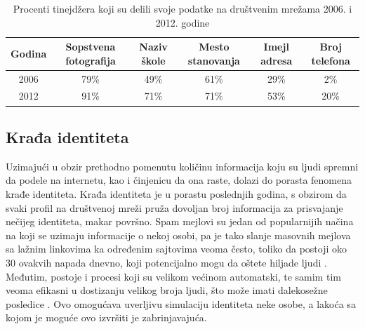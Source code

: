 \documentclass[a4paper]{article}
\begin{document}
\begin{table}[h!]
	\begin{center}
		\caption{Procenti tinejdžera koji su delili svoje podatke na društvenim mrežama 2006. i 2012. godine}
		\begin{tabular}{|c | c c c c c|} \hline
			Godina & Sopstvena fotografija & Naziv škole & Mesto stanovanja & Imejl adresa & Broj telefona \\
			\hline
			2006 & 79\% & 49\% & 61\% & 29\% & 2\% \\
			2012 & 91\% & 71\% & 71\% & 53\% & 20\%\\
			\hline
		\end{tabular}
		\label{tab:tabela1}
	\end{center}
\end{table}

\subsection{Krađa identiteta}
Uzimajući u obzir prethodno pomenutu količinu informacija koju su ljudi spremni da podele na internetu, kao i činjenicu da ona raste, dolazi do porasta fenomena krađe identiteta. Krađa identiteta je u porastu poslednjih godina, s obzirom da svaki profil na društvenoj mreži pruža dovoljan broj informacija za prisvajanje nečijeg identiteta, makar površno. Spam mejlovi su jedan od popularnijih načina na koji se uzimaju informacije o nekoj osobi, pa je tako slanje masovnih mejlova sa lažnim linkovima ka određenim sajtovima veoma često, toliko da postoji oko 30 ovakvih napada dnevno, koji potencijalno mogu da oštete hiljade ljudi \cite{it1}. Međutim, postoje i procesi koji su velikom većinom automatski, te samim tim veoma efikasni u dostizanju velikog broja ljudi, što može imati dalekosežne posledice \cite{it2}. Ovo omogućava uverljivu simulaciju identiteta neke osobe, a lakoća sa kojom je moguće ovo izvršiti je zabrinjavajuća.
\end{document}
